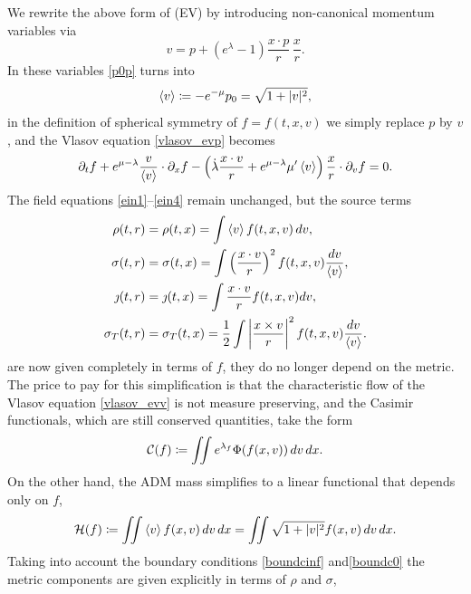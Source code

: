 \documentclass[11pt]{article}
\begin{document}
We rewrite the above form of (EV) by introducing 
non-canonical momentum variables via
\begin{equation} \label{vdef}
  v = p + (e^\lambda -1)\frac{x\cdot p}{r} \, \frac{x}{r}.
\end{equation}
In these variables \eqref{p0p} turns into
\begin{equation} \label{p0v}
  \left\langle v\right\rangle \coloneqq - e^{-\mu} p_0
  = \sqrt{1+|v|^2},
\end{equation}
in the definition of spherical symmetry of $f=f(t,x,v)$ we simply replace
$p$ by $v$, and the Vlasov equation \eqref{vlasov_evp} becomes
\begin{equation} \label{vlasov_evv}
  \partial_t f + e^{\mu - \lambda}\frac{v}{\left\langle v\right\rangle}\cdot \partial_x f -
  \left( \dot \lambda \frac{x\cdot v}{r} + e^{\mu - \lambda} \mu'
  \left\langle v\right\rangle \right) \frac{x}{r} \cdot \partial_v f =0 .
\end{equation}
The field equations \eqref{ein1}--\eqref{ein4} remain unchanged, but
the source terms
\begin{align}
  \rho(t,r)
  &=
  \rho(t,x) = \int \left\langle v\right\rangle f(t,x,v)\,dv ,\label{rv}\\
  \sigma(t,r)
  &=
  \sigma(t,x) = \int \left(\frac{x\cdot v}{r}\right)^2
  f(t,x,v)\frac{dv}{\left\langle v\right\rangle}, \label{pv}\\
  \jmath(t,r)
  &=
  \jmath(t,x) = \int \frac{x\cdot v}{r} f(t,x,v) dv, \label{jv}\\
  \sigma_T(t,r)
  &=
  \sigma_T(t,x) = \frac{1}{2} \int \left|{\frac{x\times v}{r}}\right|^2
  f(t,x,v) \frac{dv}{\left\langle v\right\rangle}. \label{pv_T}
\end{align}
are now given completely in terms of $f$, they do no longer depend on
the metric. The price to pay for this simplification is that the
characteristic flow of the Vlasov equation \eqref{vlasov_evv} is not
measure preserving, and the Casimir functionals, which are still
conserved quantities, take the form
\begin{equation} \label{casi_evv}
  {\cal C}(f) \coloneqq \iint e^{\lambda_f} \Phi(f(x,v))\,dv\,dx.
\end{equation}
On the other hand, the ADM mass simplifies to a linear functional
that depends only on $f$,
\begin{equation} \label{energy_evv}
  {\cal H}(f)
  \coloneqq \iint \left\langle v\right\rangle f(x,v)\,dv\,dx = \iint \sqrt{1+|v|^2} f(x,v)\,dv\,dx.
\end{equation}
Taking into account the boundary conditions
\eqref{boundcinf} and\eqref{boundc0}
the metric components are given explicitly in terms of $\rho$ and $\sigma$,
\end{document}
